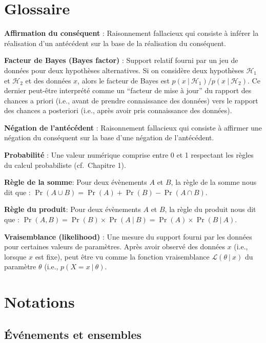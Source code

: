 \documentclass[
  a4paper,11pt,twoside,onecolumn,openright,final,oldfontcommands]{memoir}
\theoremstyle{definition}
\theoremstyle{definition}
\theoremstyle{definition}
\theoremstyle{definition}
\theoremstyle{remark}
\begin{document}
\hypertarget{appendix-annexes}{%
\appendix}


\hypertarget{glossaire}{%
\chapter{Glossaire}\label{glossaire}}

\textbf{Affirmation du conséquent} : Raisonnement fallacieux qui consiste à inférer la réalisation d'un antécédent sur la base de la réalisation du conséquent.

\textbf{Facteur de Bayes (Bayes factor)} : Support relatif fourni par un jeu de données pour deux hypothèses alternatives. Si on considère deux hypothèses \(\mathcal{H}_{1}\) et \(\mathcal{H}_{2}\) et des données \(x\), alors le facteur de Bayes est \(p(x \:\vert\:\mathcal{H}_{1}) / p(x \:\vert\:\mathcal{H}_{2})\). Ce dernier peut-être interprété comme un ``facteur de mise à jour'' du rapport des chances a priori (i.e., avant de prendre connaissance des données) vers le rapport des chances a posteriori (i.e., après avoir pris connaissance des données).

\textbf{Négation de l'antécédent} : Raisonnement fallacieux qui consiste à affirmer une négation du conséquent sur la base d'une négation de l'antécédent.

\textbf{Probabilité} : Une valeur numérique comprise entre 0 et 1 respectant les règles du calcul probabiliste (cf.~Chapitre 1).

\textbf{Règle de la somme}: Pour deux évènements \(A\) et \(B\), la règle de la somme nous dit que : \(\Pr(A \cup B) = \Pr(A) + \Pr(B) - \Pr(A \cap B)\).

\textbf{Règle du produit}: Pour deux évènements \(A\) et \(B\), la règle du produit nous dit que : \(\Pr(A, B) = \Pr(B) \times \Pr(A \:\vert\:B) = \Pr(A) \times \Pr(B \:\vert\:A)\).

\textbf{Vraisemblance (likelihood)} : Une mesure du support fourni par les données pour certaines valeurs de paramètres. Après avoir observé des données \(x\) (i.e., lorsque \(x\) est fixe), peut être vu comme la fonction vraisemblance \(\mathcal{L}(\theta \:\vert\:x)\) du paramètre \(\theta\) (i.e., \(p(X = x \:\vert\:\theta)\).

\hypertarget{notations}{%
\chapter{Notations}\label{notations}}

\hypertarget{uxe9vuxe9nements-et-ensembles}{%
\section*{Événements et ensembles}\label{uxe9vuxe9nements-et-ensembles}}
\end{document}
